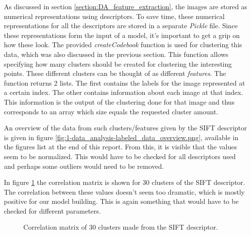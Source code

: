 As discussed in section \ref{section:DA_feature_extraction}, the images are stored as numerical representations using descriptors.
To save time, these numerical representations for all the descriptors are stored in a separate \emph{Pickle} file.
Since these representations form the input of a model, it's important to get a grip on how these look.
The provided \emph{createCodebook} function is used for clustering this data, which was also discussed in the previous section.
This function allows specifying how many clusters should be created for clustering the interesting points.
These different clusters can be thought of as different \emph{features}.
The function returns 2 lists.
The first contains the labels for the image represented at a certain index.
The other contains information about each image at that index.
This information is the output of the clustering done for that image and thus corresponds to an array which size equals the requested cluster amount.

An overview of the data from such clusters/features given by the SIFT descriptor is given in figure \ref{fig:1-data_analysis-labeled_data_overview.png}, available in the figures list at the end of this report.
From this, it is visible that the values seem to be normalized.
This would have to be checked for all descriptors used and perhaps some outliers would need to be removed.

In figure \ref{fig:1-data_analysis-correlation_matrix} the correlation matrix is shown for 30 clusters of the SIFT descriptor.
The correlation between these values doesn't seem too dramatic, which is mostly positive for our model building.
This is again something that would have to be checked for different parameters.

\begin{figure}[H]
    \centering
    \captionsetup{width=0.7\linewidth}
    \captionsetup{justification=centering}
    \caption{Correlation matrix of 30 clusters made from the SIFT descriptor.}
    \label{fig:1-data_analysis-correlation_matrix}
\end{figure}